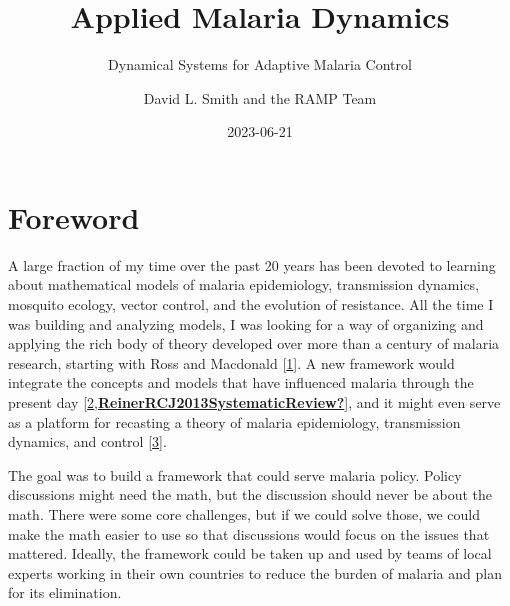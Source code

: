 \documentclass[
]{book}
\title{Applied Malaria Dynamics}
\subtitle{Dynamical Systems for Adaptive Malaria Control}
\author{David L. Smith and the RAMP Team}
\date{2023-06-21}
\begin{document}
\maketitle

{
\setcounter{tocdepth}{2}
\tableofcontents
}
\hypertarget{foreword}{%
\chapter*{Foreword}\label{foreword}}

A large fraction of my time over the past 20 years has been devoted to learning about mathematical models of malaria epidemiology, transmission dynamics, mosquito ecology, vector control, and the evolution of resistance. All the time I was building and analyzing models, I was looking for a way of organizing and applying the rich body of theory developed over more than a century of malaria research, starting with Ross and Macdonald {[}\protect\hyperlink{ref-SmithDL2012_RossMacdonald}{1}{]}.
A new framework would integrate the concepts and models that have influenced malaria through the present day {[}\protect\hyperlink{ref-SmithNR2018AgentbasedModels}{2},\protect\hyperlink{ref-ReinerRCJ2013SystematicReview}{\textbf{ReinerRCJ2013SystematicReview?}}{]}, and it might even serve as a platform for recasting a theory of malaria epidemiology, transmission dynamics, and control {[}\protect\hyperlink{ref-SmithDL2014_Recasting}{3}{]}.

The goal was to build a framework that could serve malaria policy. Policy discussions might need the math, but the discussion should never be about the math. There were some core challenges, but if we could solve those, we could make the math easier to use so that discussions would focus on the issues that mattered. Ideally, the framework could be taken up and used by teams of local experts working in their own countries to reduce the burden of malaria and plan for its elimination.
\end{document}
